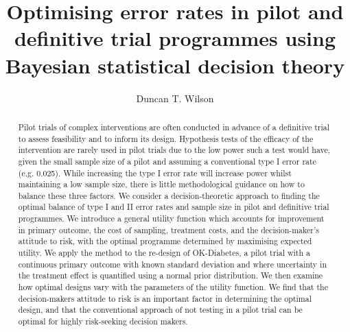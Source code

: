 \documentclass[sagev, Crown]{sagej}
\begin{document}

\title{Optimising error rates in pilot and definitive trial programmes using Bayesian statistical decision theory}

\author{Duncan T. Wilson}%



\begin{abstract}
Pilot trials of complex interventions are often conducted in advance of a definitive trial to assess feasibility and to inform its design. Hypothesis tests of the efficacy of the intervention are rarely used in pilot trials due to the low power such a test would have, given the small sample size of a pilot and assuming a conventional type I error rate (e.g. 0.025). While increasing the type I error rate will increase power whilst maintaining a low sample size, there is little methodological guidance on how to balance these three factors. We consider a decision-theoretic approach to finding the optimal balance of type I and II error rates and sample size in pilot and definitive trial programmes. We introduce a general utility function which accounts for improvement in primary outcome, the cost of sampling, treatment costs, and the decision-maker's attitude to risk, with the optimal programme determined by maximising expected utility. We apply the method to the re-design of OK-Diabetes, a pilot trial with a continuous primary outcome with known standard deviation and where uncertainty in the treatment effect is quantified using a normal prior distribution. We then examine how optimal designs vary with the parameters of the utility function. We find that the decision-makers attitude to risk is an important factor in determining the optimal design, and that the conventional approach of not testing in a pilot trial can be optimal for highly risk-seeking decision makers.
\end{abstract}

\end{document}
